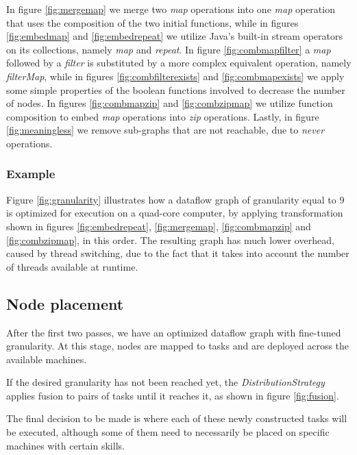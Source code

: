 \documentclass[sigplan,review,anonymous]{acmart}\settopmatter{printfolios=true}
\begin{document}
\newpage
In figure \ref{fig:mergemap} we merge two \textit{map} operations into one \textit{map} operation that uses the composition of the two initial functions, while in figures \ref{fig:embedmap} and \ref{fig:embedrepeat} we utilize Java's built-in stream operators on its collections, namely \textit{map} and \textit{repeat}. In figure \ref{fig:combmapfilter} a \textit{map} followed by a \textit{filter} is substituted by a more complex equivalent operation, namely \textit{filterMap}, while in figures \ref{fig:combfilterexists} and \ref{fig:combmapexists} we apply some simple properties of the boolean functions involved to decrease the number of nodes. In figures \ref{fig:combmapzip} and \ref{fig:combzipmap} we utilize function composition to embed \textit{map} operations into \textit{zip} operations. Lastly, in figure \ref{fig:meaningless} we remove sub-graphs that are not reachable, due to \textit{never} operations.

\subsubsection{Example}

Figure \ref{fig:granularity} illustrates how a dataflow graph of granularity equal to 9 is optimized for execution on a quad-core computer, by applying transformation shown in figures \ref{fig:embedrepeat}, \ref{fig:mergemap}, \ref{fig:combmapzip} and \ref{fig:combzipmap}, in this order. The resulting graph has much lower overhead, caused by thread switching, due to the fact that it takes into account the number of threads available at runtime.


\subsection{Node placement}

After the first two passes, we have an optimized dataflow graph with fine-tuned granularity. At this stage, nodes are mapped to tasks and are deployed across the available machines. 

If the desired granularity has not been reached yet, the \textit{DistributionStrategy} applies fusion to pairs of tasks until it reaches it, as shown in figure \ref{fig:fusion}.


The final decision to be made is where each of these newly constructed tasks will be executed, although some of them need to necessarily be placed on specific machines with certain skills. 
\end{document}
